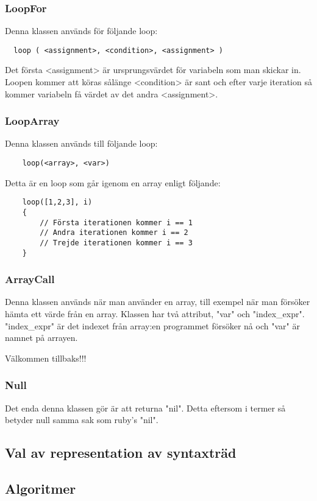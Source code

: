 \documentclass{TDP003mall}
\begin{document}
\subsubsection{LoopFor}
Denna klassen används för följande loop:
\begin{lstlisting}
  loop ( <assignment>, <condition>, <assignment> )
\end{lstlisting}
Det första <assignment> är ursprungsvärdet för variabeln som man skickar in. Loopen kommer att köras sålänge <condition> är sant och efter varje iteration så kommer variabeln få värdet av det andra <assignment>.

\subsubsection{LoopArray}
Denna klassen används till följande loop:
\begin{lstlisting}
    loop(<array>, <var>)
\end{lstlisting}
Detta är en loop som går igenom en array enligt följande:
\begin{lstlisting}
    loop([1,2,3], i)
    {
        // Första iterationen kommer i == 1
        // Andra iterationen kommer i == 2
        // Trejde iterationen kommer i == 3
    }
\end{lstlisting}

\subsubsection{ArrayCall}
Denna klassen används när man använder en array, till exempel när man försöker hämta ett värde från en array. Klassen har två attribut, "var" och "index\_expr". "index\_expr" är det indexet från array:en programmet försöker nå och "var" är namnet på arrayen.

Välkommen tillbaks!!!

\subsubsection{Null}
Det enda denna klassen gör är att returna "nil". Detta eftersom i termer så betyder null samma sak som ruby's "nil".

\subsection{Val av representation av syntaxträd}

\subsection{Algoritmer}
\end{document}
